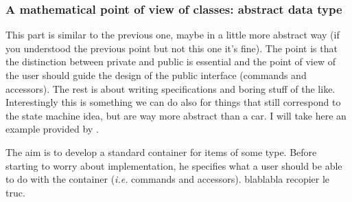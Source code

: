 \documentclass[12pt]{article}
\begin{document}
\subsubsection{A mathematical point of view of classes: abstract data type}
This part is similar to the previous one, maybe in a little more abstract way (if you understood the previous point but not this one it's fine). The point is that the distinction between private and public is essential and the point of view of the user should guide the design of the public interface (commands and accessors). The rest is about writing specifications and boring stuff of the like. Interestingly this is something we can do also for things that still correspond to the state machine idea, but are way more abstract than a car. I will take here an example provided by \citet{meyer}.

The aim is to develop a standard container for items of some type. Before starting to worry about implementation, he specifies what a user should be able to do with the container (\textit{i.e.} commands and accessors). blablabla recopier le truc.
\end{document}
